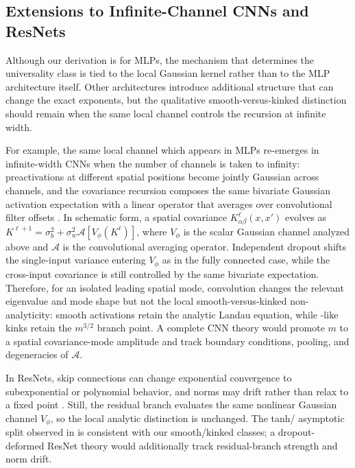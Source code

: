 \FloatBarrier

\subsection{Extensions to Infinite-Channel CNNs and ResNets}
\label{app:cnn_extension}

Although our derivation is for MLPs, the mechanism that determines the universality class is tied to the local Gaussian kernel rather than to the MLP architecture itself. Other architectures introduce additional structure that can change the exact exponents, but the qualitative smooth-versus-kinked distinction should remain when the same local channel controls the recursion at infinite width.

For example, the same local channel which appears in MLPs re-emerges in infinite-width CNNs when the number of channels is taken to infinity: preactivations at different spatial positions become jointly Gaussian across channels, and the covariance recursion composes the same bivariate Gaussian activation expectation with a linear operator that averages over convolutional filter offsets \cite{cnnslecun,xiao2018dynamicalisometrymeanfield}. In schematic form, a spatial covariance \(K^\ell_{\alpha\beta}(x,x')\) evolves as \(K^{\ell+1}=\sigma_b^2+\sigma_w^2\mathcal A[V_\phi(K^\ell)]\), where \(V_\phi\) is the scalar Gaussian channel analyzed above and \(\mathcal A\) is the convolutional averaging operator. Independent dropout shifts the single-input variance entering \(V_\phi\) as in the fully connected case, while the cross-input covariance is still controlled by the same bivariate expectation. Therefore, for an isolated leading spatial mode, convolution changes the relevant eigenvalue and mode shape but not the local smooth-versus-kinked non-analyticity: smooth activations retain the analytic Landau equation, while \relu{}-like kinks retain the \(m^{3/2}\) branch point. A complete CNN theory would promote \(m\) to a spatial covariance-mode amplitude and track boundary conditions, pooling, and degeneracies of \(\mathcal A\).

In ResNets, skip connections can change exponential convergence to subexponential or polynomial behavior, and norms may drift rather than relax to a fixed point \cite{yang2017meanfieldresnets}. Still, the residual branch evaluates the same nonlinear Gaussian channel \(V_\phi\), so the local analytic distinction is unchanged. The tanh/\relu{} asymptotic split observed in \cite{yang2017meanfieldresnets} is consistent with our smooth/kinked classes; a dropout-deformed ResNet theory would additionally track residual-branch strength and norm drift.

